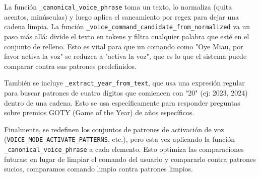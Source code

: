 \documentclass[letterpaper,12pt]{article}
\begin{document}
La función \texttt{\_canonical\_voice\_phrase} toma un texto, lo normaliza (quita acentos, minúsculas) y luego aplica el saneamiento por regex para dejar una cadena limpia.
La función \texttt{\_voice\_command\_candidate\_from\_normalized} va un paso más allá: divide el texto en tokens y filtra cualquier palabra que esté en el conjunto de relleno. Esto es vital para que un comando como "Oye Miau, por favor activa la voz" se reduzca a "activa la voz", que es lo que el sistema puede comparar contra sus patrones predefinidos.

También se incluye \texttt{\_extract\_year\_from\_text}, que usa una expresión regular para buscar patrones de cuatro dígitos que comiencen con "20" (ej: 2023, 2024) dentro de una cadena. Esto se usa específicamente para responder preguntas sobre premios GOTY (Game of the Year) de años específicos.

Finalmente, se redefinen los conjuntos de patrones de activación de voz (\texttt{VOICE\_MODE\_ACTIVATE\_PATTERNS}, etc.), pero esta vez aplicando la función \texttt{\_canonical\_voice\_phrase} a cada elemento. Esto optimiza las comparaciones futuras: en lugar de limpiar el comando del usuario y compararlo contra patrones sucios, comparamos comando limpio contra patrones limpios.
\end{document}
